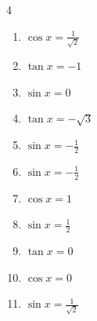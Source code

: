 \begin{multicols}{4}
\begin{enumerate}

  \item $\displaystyle \cos{x}  = \frac{1}{\sqrt{2}}$


\columnbreak %

  \item $\displaystyle \tan{x}  = -1$


  \item $\displaystyle \sin{x}  = 0$

        \phantom{$\displaystyle x = 0 , \pi$}

  \item $\displaystyle \tan{x}  = -\sqrt{3}$


  \item $\displaystyle \sin{x}  = -\frac{1}{2}$


  \item $\displaystyle \sin{x}  = -\frac{1}{2}$


  \item $\displaystyle \cos{x}  = 1$

        \phantom{$\displaystyle x = 0$}

  \item $\displaystyle \sin{x}  = \frac{1}{2}$


  \item $\displaystyle \tan{x}  = 0$

        \phantom{$\displaystyle x = 0 , \pi$}

  \item $\displaystyle \cos{x}  = 0$


  \item $\displaystyle \sin{x}  = \frac{1}{\sqrt{2}}$



\end{enumerate}
\end{multicols}
